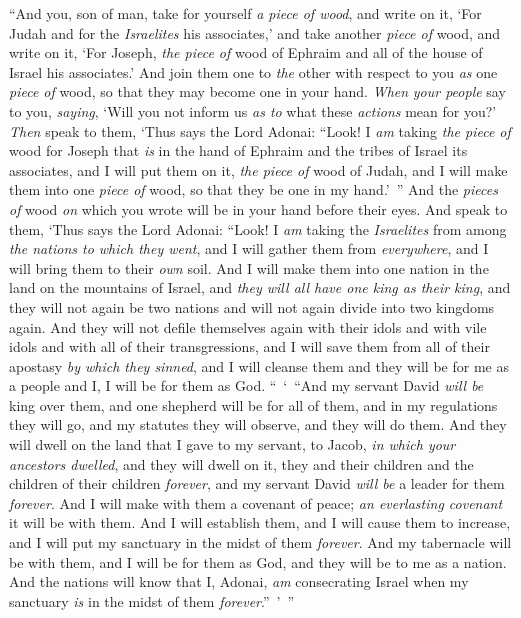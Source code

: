 \begin{biblechapter}
\verse “And you, son of man, take for yourself \textit{a piece of wood}, and write on it, ‘For Judah and for the \textit{Israelites} his associates,’ and take another \textit{piece of} wood, and write on it, ‘For Joseph, \textit{the piece of} wood of Ephraim and all of the house of Israel his associates.’
\verse And join them one to \textit{the} other with respect to you \textit{as} one \textit{piece of} wood, so that they may become one in your hand.
\verse \textit{When} \textit{your people} say to you, \textit{saying}, ‘Will you not inform us \textit{as to} what these \textit{actions} mean for you?’
\verse \textit{Then} speak to them, ‘Thus says the Lord Adonai: “Look! I \textit{am} taking \textit{the piece of} wood for Joseph that \textit{is} in the hand of Ephraim and the tribes of Israel its associates, and I will put them on it, \textit{the piece of} wood of Judah, and I will make them into one \textit{piece of} wood, so that they be one in my hand.’ ”
\verse And the \textit{pieces of} wood \textit{on} which you wrote will be in your hand before their eyes.
\verse And speak to them, ‘Thus says the Lord Adonai: “Look! I \textit{am} taking the \textit{Israelites} from among \textit{the nations to which they went}, and I will gather them from \textit{everywhere}, and I will bring them to their \textit{own} soil.
\verse And I will make them into one nation in the land on the mountains of Israel, and \textit{they will all have one king as their king}, and they will not again be two nations and will not again divide into two kingdoms again.
\verse And they will not defile themselves again with their idols and with vile idols and with all of their transgressions, and I will save them from all of their apostasy \textit{by which they sinned}, and I will cleanse them and they will be for me as a people and I, I will be for them as God.
\verse “ ‘ “And my servant David \textit{will be} king over them, and one shepherd will be for all of them, and in my regulations they will go, and my statutes they will observe, and they will do them.
\verse And they will dwell on the land that I gave to my servant, to Jacob, \textit{in which your ancestors dwelled}, and they will dwell on it, they and their children and the children of their children \textit{forever}, and my servant David \textit{will be} a leader for them \textit{forever}.
\verse And I will make with them a covenant of peace; \textit{an everlasting covenant} it will be with them. And I will establish them, and I will cause them to increase, and I will put my sanctuary in the midst of them \textit{forever}.
\verse And my tabernacle will be with them, and I will be for them as God, and they will be to me as a nation.
\verse And the nations will know that I, Adonai, \textit{am} consecrating Israel when my sanctuary \textit{is} in the midst of them \textit{forever}.” ’ ”
\end{biblechapter}

